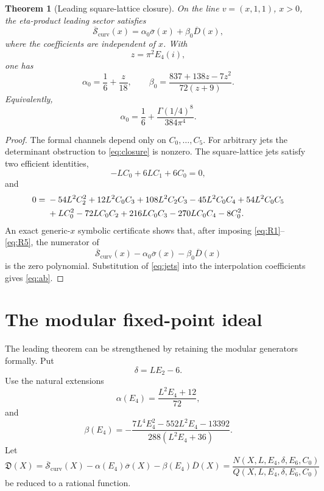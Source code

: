 \documentclass[11pt]{article}
\newtheorem{theorem}{Theorem}[section]
\theoremstyle{definition}
\theoremstyle{remark}
\newcommand{\cD}{\mathfrak{D}}
\newcommand{\bsigma}{\overline{\sigma}}
\newcommand{\bD}{\overline{D}}
\newcommand{\bSc}{\overline{\mathcal{S}}_{\mathrm{curv}}}
\begin{document}
\begin{theorem}[Leading square-lattice closure]\label{thm:leading}
On the line \(v=(x,1,1)\), \(x>0\), the eta-product leading sector satisfies
\begin{equation}\label{eq:closure}
 \bSc(x)=\alpha_0\bsigma(x)+\beta_0\bD(x),
\end{equation}
where the coefficients are independent of \(x\).  With
\[
 z=\pi^2E_4(i),
\]
one has
\begin{equation}\label{eq:ab}
 \alpha_0=\frac16+\frac{z}{18},
 \qquad
 \beta_0=\frac{837+138z-7z^2}{72(z+9)}.
\end{equation}
Equivalently,
\[
 \alpha_0=\frac16+\frac{\Gamma(1/4)^8}{384\pi^4}.
\]
\end{theorem}

\begin{proof}
The formal channels depend only on \(C_0,\ldots,C_5\).  For arbitrary jets the determinant obstruction to \eqref{eq:closure} is nonzero.  The square-lattice jets satisfy two efficient identities,
\begin{equation}\label{eq:R1}
 -LC_0+6LC_1+6C_0=0,
\end{equation}
and
\begin{align}
 0={}&-54L^2C_2^2+12L^2C_0C_3+108L^2C_2C_3
 -45L^2C_0C_4+54L^2C_0C_5\notag\\
 &+LC_0^2-72LC_0C_2+216LC_0C_3-270LC_0C_4-8C_0^2.
 \label{eq:R5}
\end{align}
An exact generic-\(x\) symbolic certificate shows that, after imposing \eqref{eq:R1}--\eqref{eq:R5}, the numerator of
\[
 \bSc(x)-\alpha_0\bsigma(x)-\beta_0\bD(x)
\]
is the zero polynomial.  Substitution of \eqref{eq:jets} into the interpolation coefficients gives \eqref{eq:ab}.
\end{proof}

\section{The modular fixed-point ideal}

The leading theorem can be strengthened by retaining the modular generators formally.  Put
\begin{equation}\label{eq:delta}
 \delta=LE_2-6.
\end{equation}
Use the natural extensions
\begin{equation}\label{eq:abformal}
 \alpha(E_4)=\frac{L^2E_4+12}{72},
\end{equation}
and
\begin{equation}\label{eq:betaformal}
 \beta(E_4)
 =-\frac{7L^4E_4^2-552L^2E_4-13392}{288(L^2E_4+36)}.
\end{equation}
Let
\begin{equation}\label{eq:defect}
 \cD(X)=\bSc(X)-\alpha(E_4)\bsigma(X)-\beta(E_4)\bD(X)
 =\frac{N(X,L,E_4,\delta,E_6,C_0)}{Q(X,L,E_4,\delta,E_6,C_0)}
\end{equation}
be reduced to a rational function.
\end{document}
